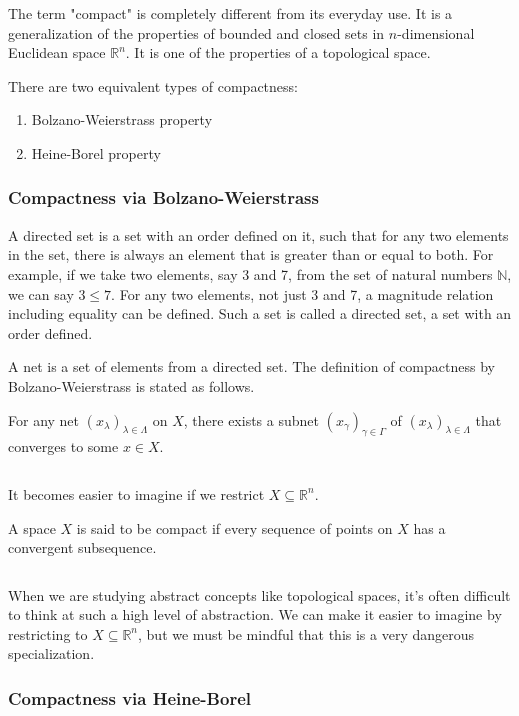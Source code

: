 \documentclass{article}
\begin{document}
The term "compact" is completely different from its everyday use.
It is a generalization of the properties of bounded and closed sets in $n$-dimensional Euclidean space $\mathbb{R}^{n}$.
It is one of the properties of a topological space.

There are two equivalent types of compactness:
\begin{enumerate}
	\item Bolzano-Weierstrass property
	\item Heine-Borel property
\end{enumerate}


\subsubsection{Compactness via Bolzano-Weierstrass}

A directed set is a set with an order defined on it, such that for any two elements in the set, there is always an element that is greater than or equal to both.
For example, if we take two elements, say 3 and 7, from the set of natural numbers $\mathbb{N}$, we can say $3 \leq 7$. For any two elements, not just 3 and 7, a magnitude relation including equality can be defined. Such a set is called a directed set, a set with an order defined.

A net is a set of elements from a directed set.
The definition of compactness by Bolzano-Weierstrass is stated as follows.

For any net $(x_{\lambda})_{\lambda \in \Lambda}$ on $X$,
there exists a subnet $(x_{\gamma})_{\gamma \in \Gamma}$ of $(x_{\lambda})_{\lambda \in \Lambda}$ that converges to some $x \in X$.

${}$

It becomes easier to imagine if we restrict $X \subseteq \mathbb{R}^{n}$.

A space $X$ is said to be compact if every sequence of points on $X$ has a convergent subsequence.

${}$

When we are studying abstract concepts like topological spaces, it's often difficult to think at such a high level of abstraction.
We can make it easier to imagine by restricting to $X \subseteq \mathbb{R}^{n}$,
but we must be mindful that this is a very dangerous specialization.


\subsubsection{Compactness via Heine-Borel}
\end{document}
